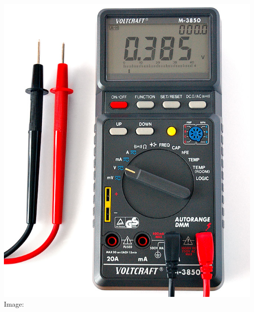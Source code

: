 \documentclass[fleqn]{beamer} %
\begin{document}
\begin{frame}
\begin{multicols}{3}
		\includegraphics[scale=.15]{Digital_Multimeter_Aka.jpg}
		\tiny{Image: \href{https://commons.wikimedia.org/wiki/File:Digital_Multimeter_Aka.jpg}{}}
		

\end{multicols}
\end{frame}
\end{document}
